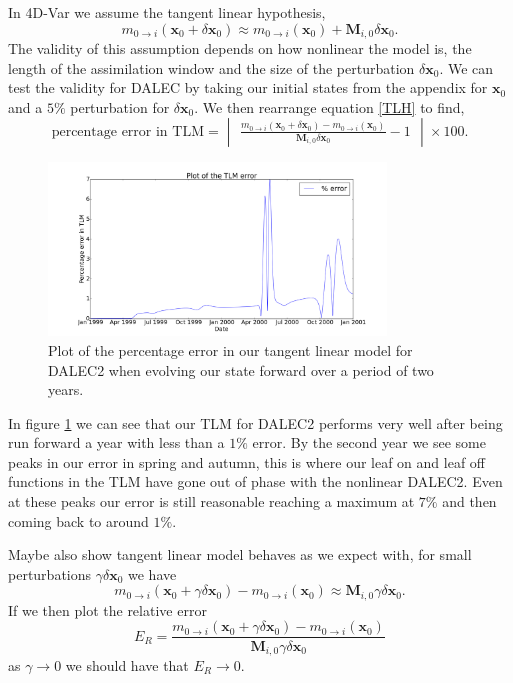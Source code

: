 \documentclass[11pt]{article}
\begin{document}
In 4D-Var we assume the tangent linear hypothesis,
\begin{equation}
m_{0\rightarrow i}(\mathbf{x}_0+\delta\mathbf{x}_0) \approx m_{0 \rightarrow i}(\mathbf{x}_0) + \mathbf{M}_{i,0}\delta\mathbf{x}_0. \label{TLH}
\end{equation}
The validity of this assumption depends on how nonlinear the model is, the length of the assimilation window and the size of the perturbation $\delta\mathbf{x}_0$. We can test the validity for DALEC by taking our initial states from the appendix for $\mathbf{x}_0$ and a $5\%$ perturbation for $\delta\mathbf{x}_0$. We then rearrange equation \ref{TLH} to find, 
\begin{equation}
\text{percentage error in TLM} = \begin{vmatrix} \frac{m_{0\rightarrow i}(\mathbf{x}_0+\delta\mathbf{x}_0) - m_{0 \rightarrow i}(\mathbf{x}_0)}{ \mathbf{M}_{i,0}\delta\mathbf{x}_0} - 1 \end{vmatrix} \times 100.
\end{equation}

\begin{figure}[ht]
    \centering
    \includegraphics[width=0.8\textwidth]{tlm_error.png}
    \caption{Plot of the percentage error in our tangent linear model for DALEC2 when evolving our state forward over a period of two years.}
    \label{fig:tlm_error}
\end{figure}

In figure \ref{fig:tlm_error} we can see that our TLM for DALEC2 performs very well after being run forward a year with less than a $1\%$ error. By the second year we see some peaks in our error in spring and autumn, this is where our leaf on and leaf off functions in the TLM have gone out of phase with the nonlinear DALEC2. Even at these peaks our error is still reasonable reaching a maximum at $7\%$ and then coming back to around $1\%$. 

Maybe also show tangent linear model behaves as we expect with, for small perturbations $\gamma\delta\textbf{x}_0$ we have
\begin{equation}
m_{0\rightarrow i}(\mathbf{x}_0+\gamma \delta\mathbf{x}_0) - m_{0 \rightarrow i}(\mathbf{x}_0) \approx\mathbf{M}_{i,0}\gamma\delta\mathbf{x}_0.
\end{equation}
If we then plot the relative error
\begin{equation}
E_R=\frac{m_{0\rightarrow i}(\mathbf{x}_0+\gamma \delta\mathbf{x}_0) - m_{0 \rightarrow i}(\mathbf{x}_0)}{\mathbf{M}_{i,0}\gamma\delta\mathbf{x}_0}
\end{equation}
as $\gamma \rightarrow 0$ we should have that $E_R \rightarrow 0$.
\end{document}
